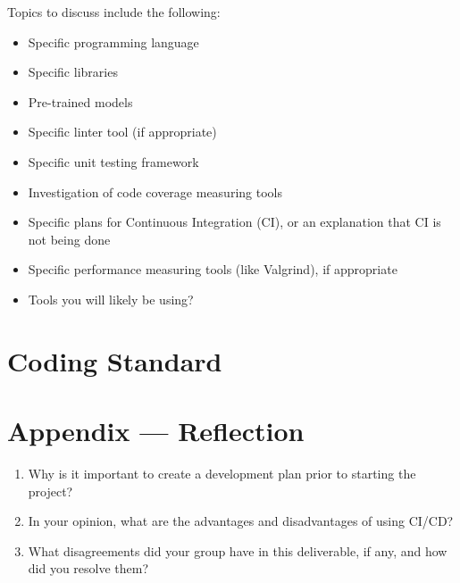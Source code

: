 \documentclass{article}
\begin{document}

Topics to discuss include the following:

\begin{itemize}
  \item Specific programming language
  \item Specific libraries
  \item Pre-trained models
  \item Specific linter tool (if appropriate)
  \item Specific unit testing framework
  \item Investigation of code coverage measuring tools
  \item Specific plans for Continuous Integration (CI), or an explanation that CI
    is not being done
  \item Specific performance measuring tools (like Valgrind), if
    appropriate
  \item Tools you will likely be using?
\end{itemize}


\section{Coding Standard}


\newpage{}

\section*{Appendix --- Reflection}




\begin{enumerate}
  \item Why is it important to create a development plan prior to starting the
    project?
  \item In your opinion, what are the advantages and disadvantages of using
    CI/CD?
  \item What disagreements did your group have in this deliverable, if any,
    and how did you resolve them?
\end{enumerate}
\end{document}
